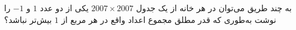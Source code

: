     \p 
به چند طریق می‌توان در هر خانه از یک جدول
$2007 \times 2007$
یکی از دو عدد
$1$
و
$-1$
را نوشت به‌طوری که قدر مطلق مجموع اعداد واقع در هر مربع از
$1$
بیش‌تر نباشد؟
